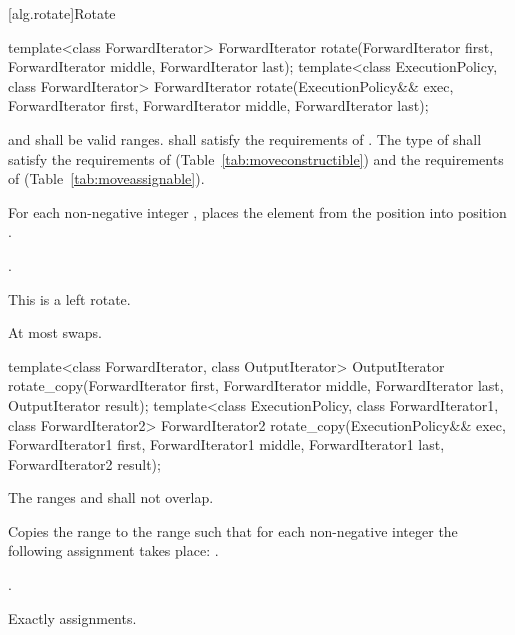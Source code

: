 [alg.rotate]{Rotate}

%
\begin{itemdecl}
template<class ForwardIterator>
  ForwardIterator
    rotate(ForwardIterator first, ForwardIterator middle, ForwardIterator last);
template<class ExecutionPolicy, class ForwardIterator>
  ForwardIterator
    rotate(ExecutionPolicy&& exec,
           ForwardIterator first, ForwardIterator middle, ForwardIterator last);
\end{itemdecl}

\begin{itemdescr}
\pnum
\requires
{}
and
shall be valid ranges.
 shall satisfy the requirements of
. The type of  shall satisfy
the requirements of 
(Table~\ref{tab:moveconstructible}) and the
requirements of
(Table~\ref{tab:moveassignable}).

\pnum
\effects
For each non-negative integer
,
places the element from the position
into position
.

\pnum
\returns {}.

\pnum
\remarks
This is a left rotate.

\pnum
\complexity
At most
swaps.
\end{itemdescr}

%
\begin{itemdecl}
template<class ForwardIterator, class OutputIterator>
  OutputIterator
    rotate_copy(ForwardIterator first, ForwardIterator middle, ForwardIterator last,
                OutputIterator result);
template<class ExecutionPolicy, class ForwardIterator1, class ForwardIterator2>
  ForwardIterator2
    rotate_copy(ExecutionPolicy&& exec,
                ForwardIterator1 first, ForwardIterator1 middle, ForwardIterator1 last,
                ForwardIterator2 result);
\end{itemdecl}

\begin{itemdescr}
\pnum
\requires
The ranges
and
shall not overlap.

\pnum
\effects
Copies the range
to the range
such that for each non-negative integer
the following assignment takes place:
.

\pnum
\returns
{}.

\pnum
\complexity
Exactly
assignments.
\end{itemdescr}

